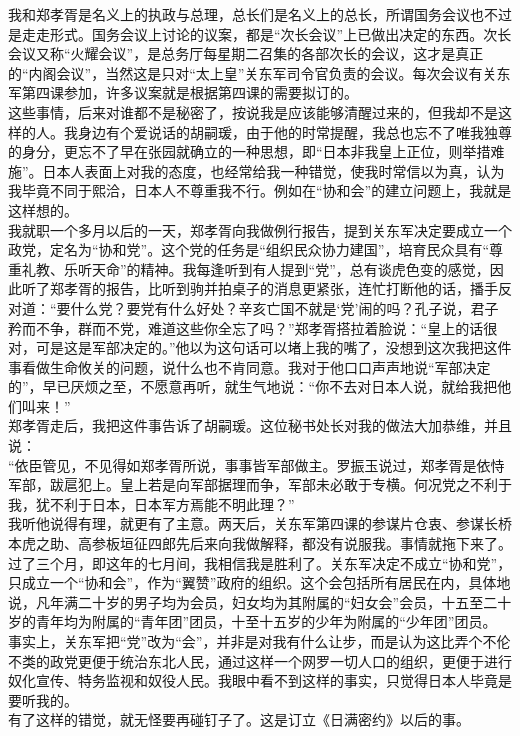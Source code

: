 我和郑孝胥是名义上的执政与总理，总长们是名义上的总长，所谓国务会议也不过是走走形式。国务会议上讨论的议案，都是“次长会议”上已做出决定的东西。次长会议又称“火耀会议”，是总务厅每星期二召集的各部次长的会议，这才是真正的“内阁会议”，当然这是只对“太上皇”关东军司令官负责的会议。每次会议有关东军第四课参加，许多议案就是根据第四课的需要拟订的。\\

这些事情，后来对谁都不是秘密了，按说我是应该能够清醒过来的，但我却不是这样的人。我身边有个爱说话的胡嗣瑗，由于他的时常提醒，我总也忘不了唯我独尊的身分，更忘不了早在张园就确立的一种思想，即“日本非我皇上正位，则举措难施”。日本人表面上对我的态度，也经常给我一种错觉，使我时常信以为真，认为我毕竟不同于熙洽，日本人不尊重我不行。例如在“协和会”的建立问题上，我就是这样想的。\\

我就职一个多月以后的一天，郑孝胥向我做例行报告，提到关东军决定要成立一个政党，定名为“协和党”。这个党的任务是“组织民众协力建国”，培育民众具有“尊重礼教、乐听天命”的精神。我每逢听到有人提到“党”，总有谈虎色变的感觉，因此听了郑孝胥的报告，比听到驹并拍桌子的消息更紧张，连忙打断他的话，播手反对道：“要什么党？要党有什么好处？辛亥亡国不就是‘党’闹的吗？孔子说，君子矜而不争，群而不党，难道这些你全忘了吗？”郑孝胥搭拉着脸说：“皇上的话很对，可是这是军部决定的。”他以为这句话可以堵上我的嘴了，没想到这次我把这件事看做生命攸关的问题，说什么也不肯同意。我对于他口口声声地说“军部决定的”，早已厌烦之至，不愿意再听，就生气地说：“你不去对日本人说，就给我把他们叫来！”\\

郑孝胥走后，我把这件事告诉了胡嗣瑗。这位秘书处长对我的做法大加恭维，并且说：\\

“依臣管见，不见得如郑孝胥所说，事事皆军部做主。罗振玉说过，郑孝胥是依恃军部，跋扈犯上。皇上若是向军部据理而争，军部未必敢于专横。何况党之不利于我，犹不利于日本，日本军方焉能不明此理？”\\

我听他说得有理，就更有了主意。两天后，关东军第四课的参谋片仓衷、参谋长桥本虎之助、高参板垣征四郎先后来向我做解释，都没有说服我。事情就拖下来了。\\

过了三个月，即这年的七月间，我相信我是胜利了。关东军决定不成立“协和党”，只成立一个“协和会”，作为“翼赞”政府的组织。这个会包括所有居民在内，具体地说，凡年满二十岁的男子均为会员，妇女均为其附属的“妇女会”会员，十五至二十岁的青年均为附属的“青年团”团员，十至十五岁的少年为附属的“少年团”团员。\\

事实上，关东军把“党”改为“会”，并非是对我有什么让步，而是认为这比弄个不伦不类的政党更便于统治东北人民，通过这样一个网罗一切人口的组织，更便于进行奴化宣传、特务监视和奴役人民。我眼中看不到这样的事实，只觉得日本人毕竟是要听我的。\\

有了这样的错觉，就无怪要再碰钉子了。这是订立《日满密约》以后的事。\\